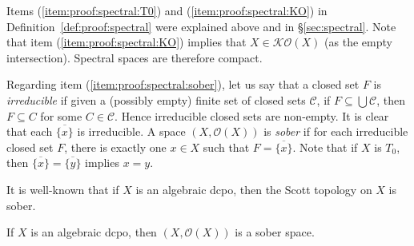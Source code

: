 \documentclass[%
  a4paper,
  UKenglish,
  cleveref,
  autoref,
  thm-restate,
  numberwithinsect,
]{lipics-v2021}
\newcommand\sle\subseteq
\newcommand\clos[1]{\overline{#1}}	%
\newcommand\Open{\mathcal{O}}		%
\newcommand\K{\mathcal{K}}		%
\begin{document}
Items (\ref{item:proof:spectral:T0})
and (\ref{item:proof:spectral:KO}) in Definition~\ref{def:proof:spectral}
were explained above and in \S\ref{sec:spectral}.
Note that item (\ref{item:proof:spectral:KO})
implies that $X \in \K\Open(X)$ (as the empty intersection).
Spectral spaces are therefore compact.

Regarding item (\ref{item:proof:spectral:sober}),
let us say that a closed set $F$ is \emph{irreducible}
if given a (possibly empty) finite set of closed sets $\mathcal{C}$,
if $F \sle \bigcup \mathcal{C}$,
then $F \sle C$ for some $C \in \mathcal{C}$.
Hence irreducible closed sets are non-empty.
It is clear that each $\clos{\{x\}}$ is irreducible.
A space $(X, \Open(X))$ is \emph{sober} if for each irreducible closed set $F$,
there is exactly one $x \in X$ such that $F = \clos{\{x\}}$.
Note that if $X$ is $T_0$,
then $\clos{\{x\}} = \clos{\{y\}}$ implies $x = y$.

It is well-known that if $X$ is an algebraic dcpo,
then the Scott topology on $X$ is sober.

\begin{lemma}
\label{lem:proof:spectral:sober}
If $X$ is an algebraic dcpo, then $(X,\Open(X))$ is a sober space.
\end{lemma}
\end{document}
